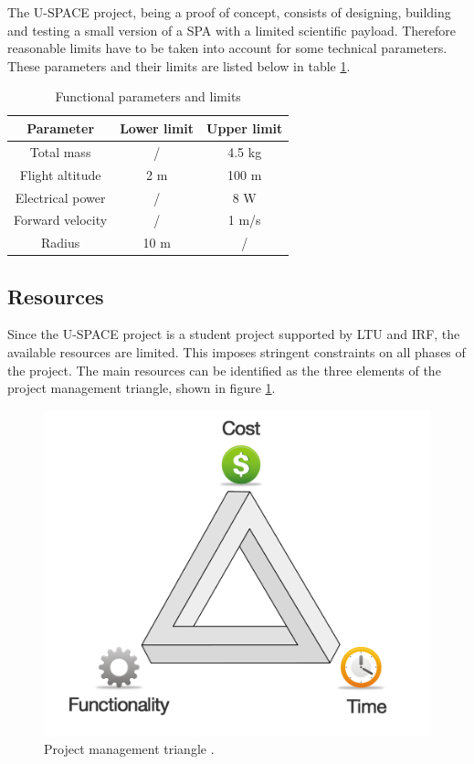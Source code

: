 The \ac{U-SPACE} project, being a proof of concept, consists of designing, building and testing a small version of a \ac{SPA} with a limited scientific payload. Therefore reasonable limits have to be taken into account for some technical parameters. These parameters and their limits are listed below in table \ref{tab:functionality}.

\begin{table}[H]
\centering
\caption{Functional parameters and limits}
\label{tab:functionality}
\begin{tabular}{c c c}
\hline
\textbf{Parameter} & \textbf{Lower limit} & \textbf{Upper limit}\\ \hline
Total mass & / & 4.5 kg\\
Flight altitude & 2 m & 100 m\\
Electrical power & / & 8 W\\
Forward velocity & / & 1 m/s\\
Radius & 10 m & /\\
\hline
\end{tabular}
\end{table}

\subsection{Resources}

Since the \ac{U-SPACE} project is a student project supported by \ac{LTU} and \ac{IRF}, the available resources are limited. This imposes stringent constraints on all phases of the project. The main resources can be identified as the three elements of the project management triangle, shown in figure \ref{fig:project_triangle}.

\begin{figure}[htbp!]
\centering
\includegraphics[scale=0.2]{figures/project_triangle.png}
\caption[Project management triangle]{Project management triangle \cite{website:claromentis}.}
\label{fig:project_triangle}
\end{figure}


